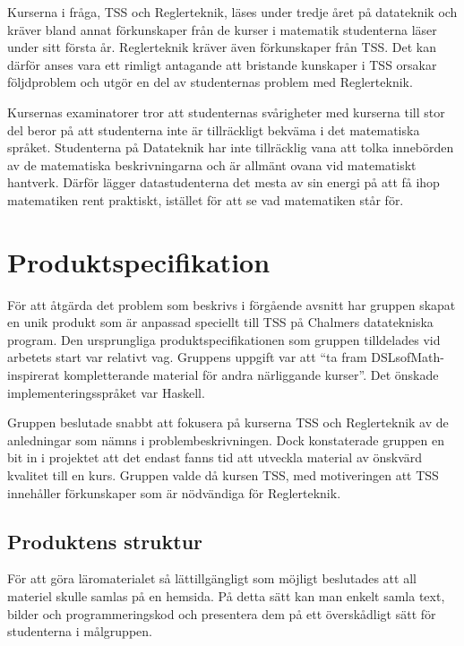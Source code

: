 \documentclass[]{article}
\begin{document}
Kurserna i fråga, TSS och Reglerteknik, läses under tredje året på
datateknik och kräver bland annat förkunskaper från de kurser i matematik
studenterna läser under sitt första år. Reglerteknik kräver även förkunskaper
från TSS. Det kan därför anses vara ett rimligt antagande att bristande
kunskaper i TSS orsakar följdproblem och utgör en del av studenternas
problem med Reglerteknik.

Kursernas examinatorer tror att studenternas svårigheter med kurserna till
stor del beror på att studenterna inte är tillräckligt bekväma
i det matematiska språket. Studenterna på Datateknik har inte tillräcklig
vana att tolka innebörden av de matematiska beskrivningarna och är allmänt
ovana vid matematiskt hantverk. Därför lägger datastudenterna det mesta av
sin energi på att få ihop matematiken rent praktiskt,
istället för att se vad matematiken står för.


\section{Produktspecifikation}


För att åtgärda det problem som beskrivs i förgående avsnitt har gruppen skapat
en unik produkt som är anpassad speciellt till TSS på Chalmers datatekniska
program. Den ursprungliga produktspecifikationen som gruppen tilldelades vid
arbetets start var relativt vag. Gruppens uppgift var att ``ta fram
DSLsofMath-inspirerat kompletterande material för andra närliggande kurser''.
Det önskade implementeringsspråket var Haskell.

Gruppen beslutade snabbt att fokusera på kurserna TSS och Reglerteknik av de
anledningar som nämns i problembeskrivningen. Dock konstaterade gruppen en bit
in i projektet att det endast fanns tid att utveckla material av önskvärd
kvalitet till en kurs. Gruppen valde då kursen TSS, med motiveringen att
TSS innehåller förkunskaper som är nödvändiga för Reglerteknik.

\subsection{Produktens struktur}
För att göra läromaterialet så lättillgängligt som möjligt beslutades att
all materiel skulle samlas på en hemsida. På detta sätt kan man enkelt
samla text, bilder och programmeringskod och presentera dem på ett
överskådligt sätt för studenterna i målgruppen.
\end{document}
